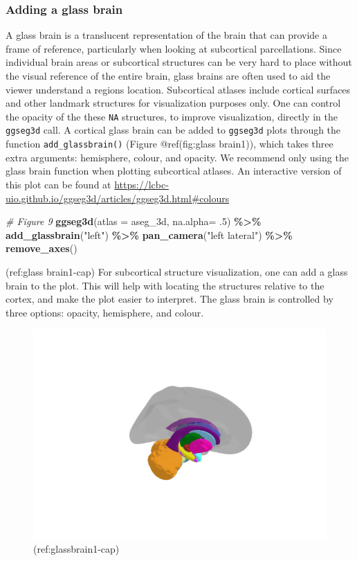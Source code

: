 \documentclass[fleqn,10pt]{wlpeerj} %
\newenvironment{Shaded}{\begin{snugshade}}{\end{snugshade}}
\newcommand{\CommentTok}[1]{\textcolor[rgb]{0.56,0.35,0.01}{\textit{#1}}}
\newcommand{\DataTypeTok}[1]{\textcolor[rgb]{0.13,0.29,0.53}{#1}}
\newcommand{\FloatTok}[1]{\textcolor[rgb]{0.00,0.00,0.81}{#1}}
\newcommand{\KeywordTok}[1]{\textcolor[rgb]{0.13,0.29,0.53}{\textbf{#1}}}
\newcommand{\NormalTok}[1]{#1}
\newcommand{\OperatorTok}[1]{\textcolor[rgb]{0.81,0.36,0.00}{\textbf{#1}}}
\newcommand{\StringTok}[1]{\textcolor[rgb]{0.31,0.60,0.02}{#1}}
\begin{document}
\hypertarget{adding-a-glass-brain}{%
\subsubsection{Adding a glass brain}\label{adding-a-glass-brain}}

A glass brain is a translucent representation of the brain that can provide a frame of reference, particularly when looking at subcortical parcellations.
Since individual brain areas or subcortical structures can be very hard to place without the visual reference of the entire brain, glass brains are often used to aid the viewer understand a regions location.
Subcortical atlases include cortical surfaces and other landmark structures for visualization purposes only.
One can control the opacity of the these \texttt{NA} structures, to improve visualization, directly in the \texttt{ggseg3d} call.
A cortical glass brain can be added to \texttt{ggseg3d} plots through the function \texttt{add\_glassbrain()} (Figure @ref(fig:glass brain1)), which takes three extra arguments: hemisphere, colour, and opacity.
We recommend only using the glass brain function when plotting subcortical atlases.
An interactive version of this plot can be found at \url{https://lcbc-uio.github.io/ggseg3d/articles/ggseg3d.html\#colours}

\begin{Shaded}
\begin{Highlighting}[]
\CommentTok{\# Figure 9}
\KeywordTok{ggseg3d}\NormalTok{(}\DataTypeTok{atlas =}\NormalTok{ aseg\_3d,}
        \DataTypeTok{na.alpha=} \FloatTok{.5}\NormalTok{) }\OperatorTok{\%>\%}
\StringTok{  }\KeywordTok{add\_glassbrain}\NormalTok{(}\StringTok{"left"}\NormalTok{) }\OperatorTok{\%>\%}
\StringTok{  }\KeywordTok{pan\_camera}\NormalTok{(}\StringTok{"left lateral"}\NormalTok{) }\OperatorTok{\%>\%}
\StringTok{  }\KeywordTok{remove\_axes}\NormalTok{()}
\end{Highlighting}
\end{Shaded}

(ref:glass brain1-cap) For subcortical structure visualization, one can add a glass brain to the plot. This will help with locating the structures relative to the cortex, and make the plot easier to interpret. The glass brain is controlled by three options: opacity, hemisphere, and colour.

\begin{figure}[H]
\includegraphics[width=0.6\linewidth]{png/ggseg3d_glass} \caption{(ref:glassbrain1-cap)}\label{fig:glassbrain1}
\end{figure}
\end{document}
